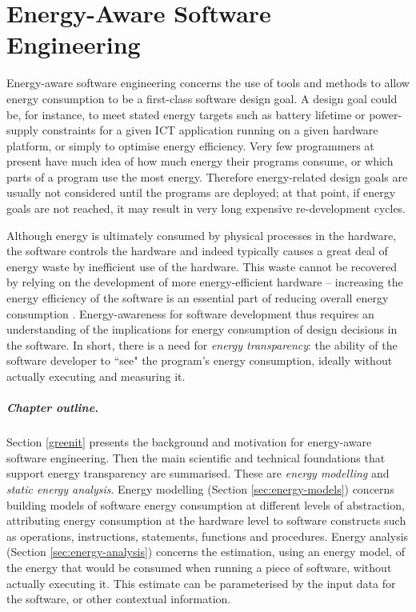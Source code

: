 \documentclass[oneside]{book}
\begin{document}
\chapter{Energy-Aware Software Engineering}

Energy-aware software engineering concerns the use of tools and methods to allow energy consumption to be a first-class software design goal. A design goal could be, for instance, to meet stated energy targets such as battery lifetime or power-supply constraints for a given ICT application running on a given hardware platform, or simply to optimise energy efficiency. Very few programmers at present have much idea of how much energy their programs consume, or which parts of a program use the most energy. Therefore energy-related design goals are usually not considered until the programs are deployed; at that point, if energy goals are not reached, it may result in very long expensive re-development cycles.


Although energy is ultimately consumed by physical processes in the hardware, the software controls the hardware and indeed typically causes a great deal of energy waste by inefficient use of the hardware. This waste cannot be recovered by relying on the development of more energy-efficient hardware -- increasing the energy efficiency of the software is an essential part of reducing overall energy consumption \cite{Furber2016}.  
 Energy-awareness for software development thus requires an understanding of the implications for energy consumption of design decisions in the software. In short, there is a need for \emph{energy transparency}: the ability of the software developer to ``see" the program's energy consumption, ideally without actually executing and measuring it. 

\paragraph{Chapter outline.}  Section \ref{greenit} presents the background and motivation for energy-aware software engineering. Then  the main scientific and technical foundations that support energy transparency are summarised.  These are \emph{energy modelling} and \emph{static energy analysis}. Energy modelling (Section \ref{sec:energy-models}) concerns building models of software energy consumption at different levels of abstraction, attributing energy consumption at the hardware level to software constructs such as operations, instructions, statements, functions and
procedures.   Energy analysis (Section \ref{sec:energy-analysis}) concerns the estimation, using an energy model, of the energy that would be consumed when running a piece of software, without actually executing it.  This estimate can be parameterised by the input data for the software, or other contextual information. 
\end{document}
